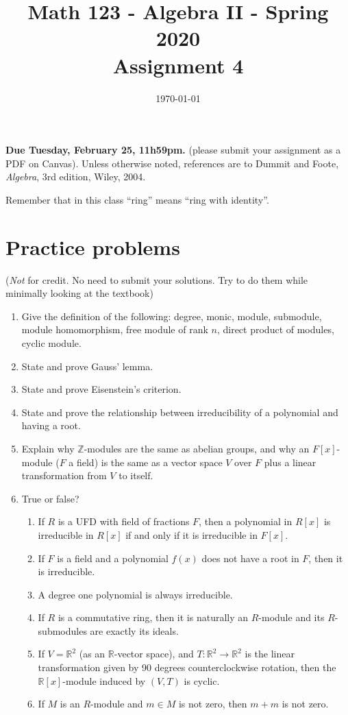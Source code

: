 \documentclass{amsart}
\title[Math 123, Spring 2020: assignment 4]{Math 123 - Algebra II - Spring 2020 \\ Assignment 4}
\date{\today}
\theoremstyle{definition}
\newcommand{\Zz}{\mathbb{Z}}
\newcommand{\Rr}{\mathbb{R}}
\begin{document}

\vspace*{-10em}
\maketitle

\textbf{Due Tuesday, February 25, 11h59pm.} (please submit your assignment as a PDF on Canvas). Unless otherwise noted, references are to Dummit and Foote, \emph{Algebra}, 3rd edition, Wiley, 2004.

Remember that in this class ``ring'' means ``ring with identity''.

\section*{Practice problems} (\emph{Not} for credit. No need to submit your solutions. Try to do them while minimally looking at the textbook)

\begin{enumerate}
\item Give the definition of the following: degree, monic, module, submodule, module homomorphism, free module of rank $n$, direct product of modules, cyclic module. 
\item State and prove Gauss' lemma.
\item State and prove Eisenstein's criterion.
\item State and prove the relationship between irreducibility of a polynomial and having a root.
\item Explain why $\Zz$-modules are the same as abelian groups, and why an $F[x]$-module ($F$ a field)  is the same as a vector space $V$ over $F$ plus a linear transformation from $V$ to itself.
\item True or false?
  \begin{enumerate}
  \item If $R$ is a UFD with field of fractions $F$, then a polynomial in $R[x]$ is irreducible in $R[x]$ if and only if it is irreducible in $F[x]$.
  \item If $F$ is a field and a polynomial $f(x)$ does not have a root in $F$, then it is irreducible.
  \item A degree one polynomial is always irreducible.
  \item If $R$ is a commutative ring, then it is naturally an $R$-module and its $R$-submodules are exactly its ideals.
  \item If $V = \Rr^2$ (as an $\Rr$-vector space), and $T: \Rr^2 \to \Rr^2$ is the linear transformation given by 90 degrees counterclockwise rotation, then the $\Rr[x]$-module induced by $(V, T)$ is cyclic.
  \item If $M$ is an $R$-module and $m \in M$ is not zero, then $m + m$ is not zero.
  \end{enumerate}
\end{enumerate}
\end{document}
